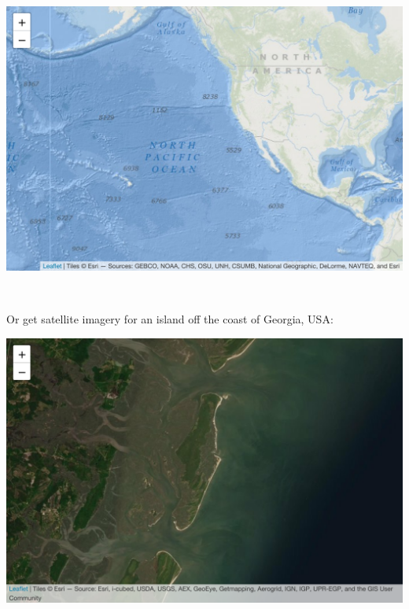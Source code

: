 \documentclass[
]{book}
\newenvironment{Shaded}{\begin{snugshade}}{\end{snugshade}}
\newcommand{\AttributeTok}[1]{\textcolor[rgb]{0.77,0.63,0.00}{#1}}
\newcommand{\FloatTok}[1]{\textcolor[rgb]{0.00,0.00,0.81}{#1}}
\newcommand{\FunctionTok}[1]{\textcolor[rgb]{0.00,0.00,0.00}{#1}}
\newcommand{\NormalTok}[1]{#1}
\newcommand{\SpecialCharTok}[1]{\textcolor[rgb]{0.00,0.00,0.00}{#1}}
\begin{document}
\includegraphics[width=694.08px]{figures/unnamed-chunk-227-1}

~

Or get satellite imagery for an island off the coast of Georgia, USA:

\begin{Shaded}
\end{Shaded}

\includegraphics[width=694.08px]{figures/unnamed-chunk-228-1}
\end{document}
